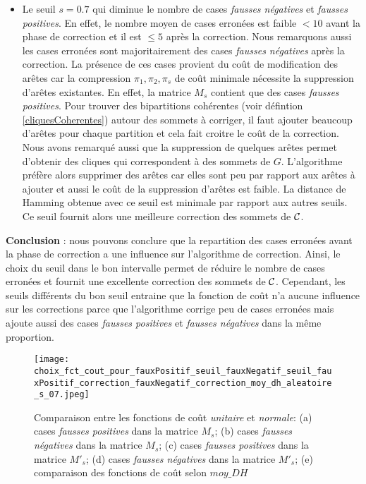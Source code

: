\begin{itemize}
	\item Le seuil $s=0.7$ qui diminue le nombre de cases {\em fausses n\'egatives} et {\em fausses positives}. En effet, le nombre moyen de cases erron\'ees est faible $< 10$ avant la phase de correction et il est $ \le 5$ apr\`es la correction. 
	Nous remarquons aussi les cases erron\'ees sont majoritairement des cases {\em fausses n\'egatives} apr\`es la correction.
	La pr\'esence de ces cases provient du co\^ut de modification des ar\^etes car la compression $\pi_1,\pi_2, \pi_s$ de co\^ut minimale n\'ecessite la suppression d'ar\^etes existantes.
	En effet, la matrice $M_s$ contient que des cases {\em fausses positives}. Pour trouver des bipartitions coh\'erentes (voir d\'efintion \ref{cliquesCoherentes}) autour des sommets \`a corriger, il faut ajouter beaucoup d'ar\^etes pour chaque partition et cela fait croitre le co\^ut de la correction. 
	Nous avons remarqu\'e aussi que la suppression de quelques ar\^etes permet d'obtenir des cliques qui correspondent \`a des sommets de $G$. L'algorithme pr\'ef\`ere alors supprimer des ar\^etes car elles sont peu par rapport aux ar\^etes \`a ajouter et aussi le co\^ut de la suppression d'ar\^etes est faible.
	 La distance de Hamming obtenue avec ce seuil est minimale par rapport aux autres seuils. Ce seuil fournit alors une meilleure correction des sommets de ${\cal C}$. 
	
\end{itemize}

{\bf Conclusion} : 
nous pouvons conclure que la repartition des cases erron\'ees avant la phase de correction a une influence sur l'algorithme de correction. 
Ainsi, le choix du seuil dans le bon intervalle permet de r\'eduire le nombre de cases erron\'ees et fournit une excellente correction des sommets de ${\cal C}$. 
Cependant,  les seuils diff\'erents du bon seuil  entraine que la fonction de co\^ut n'a aucune influence sur les corrections parce que l'algorithme corrige peu de cases erron\'ees mais ajoute aussi des cases {\em fausses positives} et {\em fausses n\'egatives} dans la m\^eme proportion. 

\begin{figure}[htb!] 
\centering
\texttt{[image: choix\_fct\_cout\_pour\_fauxPositif\_seuil\_fauxNegatif\_seuil\_fauxPositif\_correction\_fauxNegatif\_correction\_moy\_dh\_aleatoire\_s\_07.jpeg]}
\caption{ Comparaison entre les fonctions de co\^ut {\em unitaire} et {\em normale}: (a) cases {\em fausses positives} dans la matrice $M_s$; (b) cases {\em fausses n\'egatives} dans la matrice $M_s$; (c) cases {\em fausses positives} dans la matrice $M'_s$; (d) cases {\em fausses n\'egatives} dans la matrice $M'_s$; (e) comparaison des fonctions de co\^ut selon $moy\_DH$}
\label{comparaisonFctCoutUnitaireNormale} 
\end{figure}
 \FloatBarrier

